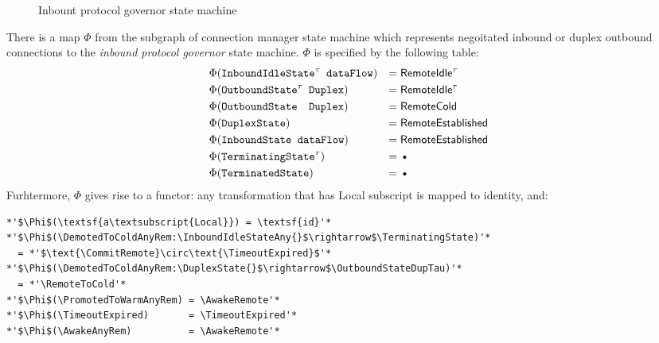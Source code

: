 \documentclass{article}
\def\InitialState{\textbullet}
\def\FinalState{\textbullet}
\def\OutboundStateDup{\texttt{OutboundState\phantom{\textsuperscript{$\tau$}} Duplex}}
\def\OutboundStateDupTau{\texttt{OutboundState\textsuperscript{$\tau$} Duplex}}
\def\DuplexState{\texttt{DuplexState}}
\def\InboundStateAny{\texttt{InboundState dataFlow}}
\def\InboundIdleStateAny{\texttt{InboundIdleState\textsuperscript{$\tau$} dataFlow}}
\def\TerminatingState{\texttt{TerminatingState\textsuperscript{$\tau$}}}
\def\TerminatedState{\texttt{TerminatedState}}
\def\PromotedToWarmAnyRem{\textsf{PromotedToWarm}\textsuperscript{\textsf{dataFlow}}\textsubscript{\textsf{Remote}}}
\def\TimeoutExpired{\textsf{TimeoutExpired}}
\def\DemotedToColdAnyRem{\textsf{DemotedToCold}\textsuperscript{\textsf{dataFlow}}\textsubscript{\textsf{Remote}}}
\def\AwakeAnyRem{\textsf{Awake}\textsuperscript{\textsf{dataFlow}}\textsubscript{\textsf{Remote}}}
\def\RemoteEstablished{\textsf{RemoteEstablished}}
\def\RemoteIdle{\textsf{RemoteIdle}\textsuperscript{$\tau$}}
\def\RemoteCold{\textsf{RemoteCold}}
\def\NewConnectionAny{\textsf{NewConnection provenance}}
\def\AwakeRemote{\textsf{AwakeRemote}}
\def\RemoteToCold{\textsf{RemoteToCold}}
\def\CommitRemote{\textsf{CommitRemote}}
\def\inbgov{\textit{inbound protocol governor}}
\begin{document}
\begin{figure}[h]
  \caption{Inbount protocol governor state machine}
  \label{fig:inbgov-state-machine}
\end{figure}

There is a map \(\Phi\) from the subgraph of connection manager state machine
which represents negoitated inbound or duplex outbound connections to the
\inbgov{} state machine.  \(\Phi\) is specified by the following table:
\begin{align*}
  & \Phi(\text{\InboundIdleStateAny}) & =\; & \text{\RemoteIdle}\\
  & \Phi(\text{\OutboundStateDupTau}) & =\; & \text{\RemoteIdle}\\
  & \Phi(\text{\OutboundStateDup})    & =\; & \text{\RemoteCold} \\
  & \Phi(\text{\DuplexState})         & =\; & \text{\RemoteEstablished} \\
  & \Phi(\text{\InboundStateAny})     & =\; & \text{\RemoteEstablished} \\
  & \Phi(\text{\TerminatingState})    & =\; & \text{\FinalState} \\
  & \Phi(\text{\TerminatedState})     & =\; & \text{\FinalState} \\
\end{align*}
Furhtermore, \(\Phi\) gives rise to a functor: any transformation that has
\textsf{Local} subscript is mapped to identity, and:
\begin{lstlisting}
*'$\Phi$(\textsf{a\textsubscript{Local}}) = \textsf{id}'*
*'$\Phi$(\DemotedToColdAnyRem:\InboundIdleStateAny{}$\rightarrow$\TerminatingState)'*
  = *'$\text{\CommitRemote}\circ\text{\TimeoutExpired}$'*
*'$\Phi$(\DemotedToColdAnyRem:\DuplexState{}$\rightarrow$\OutboundStateDupTau)'*
  = *'\RemoteToCold'*
*'$\Phi$(\PromotedToWarmAnyRem) = \AwakeRemote'*
*'$\Phi$(\TimeoutExpired)       = \TimeoutExpired'*
*'$\Phi$(\AwakeAnyRem)          = \AwakeRemote'*
\end{lstlisting}
\end{document}
